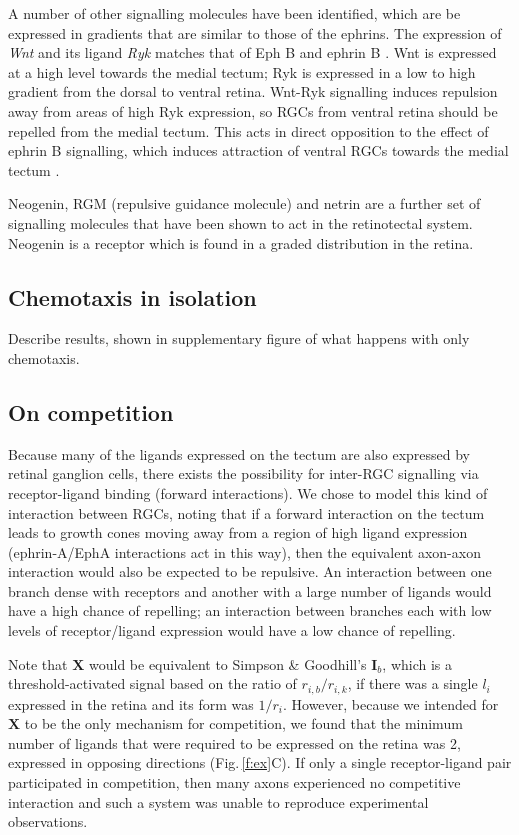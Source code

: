 \documentclass[11pt, a4paper]{article}
\begin{document}
A number of other signalling molecules have been identified, which are be expressed in gradients that are similar to those of the ephrins. 
The expression of \emph{Wnt} and its ligand \emph{Ryk} matches that of Eph B and ephrin B \citep{schmitt_wntryk_2006}. 
Wnt is expressed at a high level towards the medial tectum; Ryk is expressed in a low to high gradient from the dorsal to ventral retina.
Wnt-Ryk signalling induces repulsion away from areas of high Ryk expression, so RGCs from ventral retina should be repelled from the medial tectum. 
This acts in direct opposition to the effect of ephrin B signalling, which induces attraction of ventral RGCs towards the medial tectum \citep{hindges_ephb_2002}.

Neogenin, RGM (repulsive guidance molecule) and netrin are a further set of signalling molecules that have been shown to act in the retinotectal system.  Neogenin is a receptor which is found in a graded distribution in the retina. 

\subsection*{Chemotaxis in isolation}


Describe results, shown in supplementary figure of what happens with only chemotaxis.

\subsection*{On competition}

Because many of the ligands expressed on the tectum are also expressed by retinal ganglion cells, there exists the possibility for inter-RGC signalling via receptor-ligand binding (forward interactions). 
We chose to model this kind of interaction between RGCs, noting that if a forward interaction on the tectum leads to growth cones moving away from a region of high ligand expression (ephrin-A/EphA interactions act in this way), then the equivalent axon-axon interaction would also be expected to be repulsive. An interaction between one branch dense with receptors and another with a large number of ligands would have a high chance of repelling; an interaction between branches each with low levels of receptor/ligand expression would have a low chance of repelling.


Note that $\mathbf{X}$ would be equivalent to Simpson \& Goodhill's $\mathbf{I}_b$, which is a threshold-activated signal based on the ratio of $r_{i,b}/r_{i,k}$, if there was a single $l_i$ expressed in the retina and its form was $1/r_i$. 
However, because we intended for $\mathbf{X}$ to be the only mechanism for competition, we found that the minimum number of ligands that were required to be expressed on the retina was 2, expressed in opposing directions (Fig.\,\ref{f:ex}C). If only a single receptor-ligand pair participated in competition, then many axons experienced no competitive interaction and such a system was unable to reproduce experimental observations.
\end{document}
